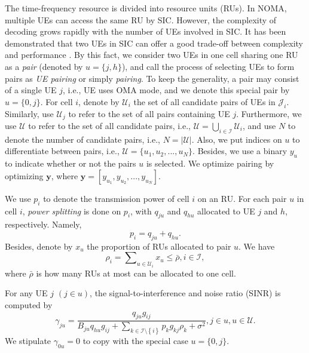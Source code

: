 \documentclass[10pt,journal,final,finalsubmission,twocolumn]{IEEEtran}
\begin{document}
The time-frequency resource is divided into resource units (RUs). In NOMA, multiple UEs can access the same RU by SIC. However, the complexity of decoding grows rapidly with the number of UEs involved in SIC. It has been demonstrated that two UEs in SIC can offer a good trade-off between complexity and performance \cite{Islam}. By this fact, we consider two UEs in one cell sharing one RU as a {\em pair} (denoted by $u=\{j,h\}$), and call the process of selecting UEs to form pairs as {\em UE pairing} or simply {\em pairing}. To keep the generality, a pair may consist of a single UE $j$, i.e., UE uses OMA mode, and we denote this special pair by $u=\{0,j\}$. For cell $i$, denote by $\mathcal{U}_i$ the set of all candidate pairs of UEs in $\mathcal{J}_i$. Similarly, use $\mathcal{U}_j$ to refer to the set of all pairs containing UE $j$. Furthermore, we use ${\mathcal{U}}$ to refer to the set of all candidate pairs, i.e., $\mathcal{U} = \bigcup _{i \in \mathcal{I}}  \mathcal{U}_i$, and use $N$ to denote the number of candidate pairs, i.e., $N=|\mathcal{U}|$. Also, we put indices on $u$ to differentiate between pairs, i.e., $\mathcal{U} = \{u_1,u_2,...,u_N\}$. Besides, we use a binary $y_{u}$ to indicate whether or not the pairs $u$ is selected. We optimize pairing by optimizing $\boldsymbol{y}$, where $\boldsymbol{y} = [y_{u_1},y_{u_2},...,y_{u_N}]$.

We use $p_i$ to denote the transmission power of cell $i$ on an RU. For each pair $u$ in cell $i$, {\em power splitting} is done on $p_i$, with $q_{ju}$ and $q_{hu}$ allocated to UE $j$ and $h$, respectively. Namely,
\begin{equation}
p_i = q_{ju} + q_{hu}.
\end{equation}
Besides, denote by $x_u$ the proportion of RUs allocated to pair $u$. We have
 \begin{equation}
 \rho_i = \sum \nolimits_{u \in {\mathcal{U}}_i} x_u \leq \bar{\rho},  i\in \mathcal{I},
 \end{equation}
where $\bar{\rho}$ is how many RUs at most can be allocated to one cell. 


For any UE $j$ $\left(j \in u\right)$, the signal-to-interference and noise ratio (SINR) is computed by
\begin{equation}
\gamma _{ju} \!=\!\frac{q_{ju}g_{ij}}{{B_{ju}q_{hu}g_{ij}}\!+\!{\sum_{k\in \mathcal{I}\setminus \left \{ i \right \}}p_kg_{kj}\rho_k}\!+\!\sigma ^2}, j\!\in\! u, u \!\in\!{\mathcal{U}}.\label{1111}
\end{equation}
We stipulate $\gamma_{0u} = 0$ to copy with the special case $u=\{0,j\}$.
\end{document}
